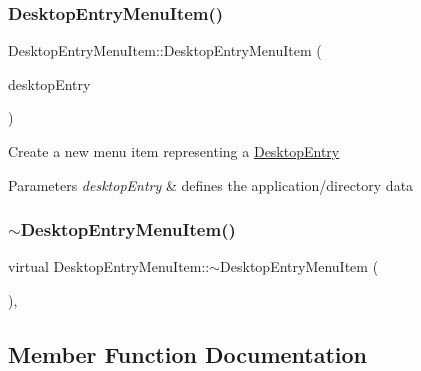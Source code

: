 \subsubsection{\texorpdfstring{Desktop\+Entry\+Menu\+Item()}{DesktopEntryMenuItem()}}
{\footnotesize\ttfamily Desktop\+Entry\+Menu\+Item\+::\+Desktop\+Entry\+Menu\+Item (\begin{DoxyParamCaption}\item[{const \mbox{\hyperlink{classDesktopEntry}{Desktop\+Entry}} \&}]{desktop\+Entry }\end{DoxyParamCaption})}

Create a new menu item representing a \mbox{\hyperlink{classDesktopEntry}{Desktop\+Entry}} 
\begin{DoxyParams}{Parameters}
{\em desktop\+Entry} & defines the application/directory data \\
\hline
\end{DoxyParams}
\mbox{\label{classDesktopEntryMenuItem_abf055f6a6556a065821761bb7c3235df}} 
\subsubsection{\texorpdfstring{$\sim$\+Desktop\+Entry\+Menu\+Item()}{~DesktopEntryMenuItem()}}
{\footnotesize\ttfamily virtual Desktop\+Entry\+Menu\+Item\+::$\sim$\+Desktop\+Entry\+Menu\+Item (\begin{DoxyParamCaption}{ }\end{DoxyParamCaption})\hspace{0.3cm}{\ttfamily [inline]}, {\ttfamily [virtual]}}



\subsection{Member Function Documentation}
\mbox{\label{classDesktopEntryMenuItem_a4c0415f2a01c9634efa99e9a78a39458}} 
